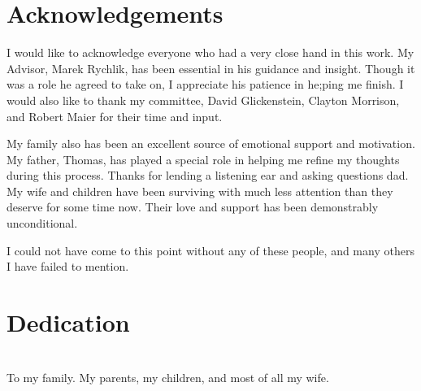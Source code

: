 \thispagestyle{empty}
\maketitle

\thispagestyle{empty}
\iffinal
\chapter*{Acknowledgements}
I would like to acknowledge everyone who had a very close hand in this work. 
My Advisor, Marek Rychlik, has been essential in his guidance and insight. Though it was a role he agreed to take on, I appreciate his patience in he;ping me finish. I would also like to thank my committee, David Glickenstein, Clayton Morrison, and Robert Maier for their time and input. 

My family also has been an excellent source of emotional support and motivation. My father, Thomas, has played a special role in helping me refine my thoughts during this process. Thanks for lending a listening ear and asking questions dad. My wife and children have been surviving with much less attention than they deserve for some time now. Their love and support has been demonstrably unconditional.

I could not have come to this point without any of these people, and many others I have failed to mention.

\newpage


\thispagestyle{empty}
\chapter*{Dedication}
\begin{center}
	\ \\
	To my family. My parents, my children, and most of all my wife.
\end{center}
\newpage
\fi


\tableofcontents
\let\tableofcontents\relax

\listoffigures
\let\listoffigures\relax

\listoftables
\let\listoftables\relax

\newpage


